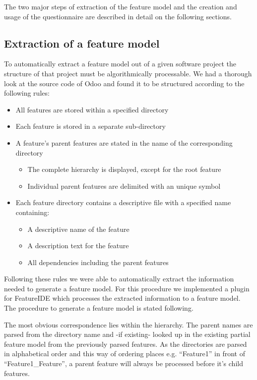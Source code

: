 The two major steps of extraction of the feature model and the creation and usage of the questionnaire are described in detail on the following sections.


\subsection{Extraction of a feature model}
To automatically extract a feature model out of a given software project the structure of that project must be algorithmically processable. We had a thorough look at the source code of Odoo and found it to be structured according to the following rules:

\begin{itemize}
	\item All features are stored within a specified directory
	\item Each feature is stored in a separate sub-directory
	\item A feature's parent features are stated in the name of the corresponding directory
	\begin{itemize}
		\item The complete hierarchy is displayed, except for the root feature
		\item Individual parent features are delimited with an unique symbol
	\end{itemize}
	\item Each feature directory contains a descriptive file with a specified name containing:
	\begin{itemize}
		\item A descriptive name of the feature
		\item A description text for the feature
		\item All dependencies including the parent features
	\end{itemize}
\end{itemize}

Following these rules we were able to automatically extract the information needed to generate a feature model. For this procedure we implemented a plugin for FeatureIDE which processes the extracted information to a feature model. The procedure to generate a feature model is stated following.

 The most obvious correspondence lies within the hierarchy. The parent names are parsed from the directory name and -if existing- looked up in the existing partial feature model from the previously parsed features. As the directories are parsed in alphabetical order and this way of ordering places e.g. ``Feature1'' in front of ``Feature1\_Feature'', a parent feature will always be processed before it's child features.

